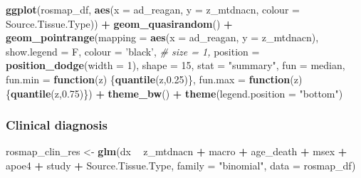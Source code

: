 \documentclass[]{book}
\newenvironment{Shaded}{\begin{snugshade}}{\end{snugshade}}
\newcommand{\CommentTok}[1]{\textcolor[rgb]{0.56,0.35,0.01}{\textit{#1}}}
\newcommand{\ControlFlowTok}[1]{\textcolor[rgb]{0.13,0.29,0.53}{\textbf{#1}}}
\newcommand{\DataTypeTok}[1]{\textcolor[rgb]{0.13,0.29,0.53}{#1}}
\newcommand{\DecValTok}[1]{\textcolor[rgb]{0.00,0.00,0.81}{#1}}
\newcommand{\FloatTok}[1]{\textcolor[rgb]{0.00,0.00,0.81}{#1}}
\newcommand{\KeywordTok}[1]{\textcolor[rgb]{0.13,0.29,0.53}{\textbf{#1}}}
\newcommand{\NormalTok}[1]{#1}
\newcommand{\OperatorTok}[1]{\textcolor[rgb]{0.81,0.36,0.00}{\textbf{#1}}}
\newcommand{\StringTok}[1]{\textcolor[rgb]{0.31,0.60,0.02}{#1}}
\begin{document}
\begin{Shaded}
\begin{Highlighting}[]
\KeywordTok{ggplot}\NormalTok{(rosmap_df, }\KeywordTok{aes}\NormalTok{(}\DataTypeTok{x =}\NormalTok{ ad_reagan, }\DataTypeTok{y =}\NormalTok{ z_mtdnacn, }\DataTypeTok{colour =}\NormalTok{ Source.Tissue.Type)) }\OperatorTok{+}\StringTok{ }
\StringTok{  }\KeywordTok{geom_quasirandom}\NormalTok{() }\OperatorTok{+}\StringTok{ }
\StringTok{  }\KeywordTok{geom_pointrange}\NormalTok{(}\DataTypeTok{mapping =} \KeywordTok{aes}\NormalTok{(}\DataTypeTok{x =}\NormalTok{ ad_reagan, }\DataTypeTok{y =}\NormalTok{ z_mtdnacn),}
                      \DataTypeTok{show.legend =}\NormalTok{ F, }\DataTypeTok{colour =} \StringTok{'black'}\NormalTok{,}
                     \CommentTok{# size = 1,}
                      \DataTypeTok{position =} \KeywordTok{position_dodge}\NormalTok{(}\DataTypeTok{width =} \DecValTok{1}\NormalTok{),}
                      \DataTypeTok{shape =} \DecValTok{15}\NormalTok{,}
                      \DataTypeTok{stat =} \StringTok{"summary"}\NormalTok{,}
                      \DataTypeTok{fun =}\NormalTok{ median,}
                      \DataTypeTok{fun.min =} \ControlFlowTok{function}\NormalTok{(z) \{}\KeywordTok{quantile}\NormalTok{(z,}\FloatTok{0.25}\NormalTok{)\},}
                      \DataTypeTok{fun.max =} \ControlFlowTok{function}\NormalTok{(z) \{}\KeywordTok{quantile}\NormalTok{(z,}\FloatTok{0.75}\NormalTok{)\}) }\OperatorTok{+}\StringTok{ }
\StringTok{  }\KeywordTok{theme_bw}\NormalTok{() }\OperatorTok{+}\StringTok{ }\KeywordTok{theme}\NormalTok{(}\DataTypeTok{legend.position =} \StringTok{"bottom"}\NormalTok{)}
\end{Highlighting}
\end{Shaded}

\hypertarget{clinical-diagnosis}{%
\subsubsection{Clinical diagnosis}\label{clinical-diagnosis}}

\begin{Shaded}
\begin{Highlighting}[]
\NormalTok{rosmap_clin_res <-}\StringTok{ }\KeywordTok{glm}\NormalTok{(dx }\OperatorTok{~}\StringTok{ }\NormalTok{z_mtdnacn }\OperatorTok{+}\StringTok{ }\NormalTok{macro }\OperatorTok{+}\StringTok{ }\NormalTok{age_death }\OperatorTok{+}\StringTok{ }\NormalTok{msex }\OperatorTok{+}\StringTok{ }\NormalTok{apoe4 }\OperatorTok{+}\StringTok{ }\NormalTok{study }\OperatorTok{+}\StringTok{ }\NormalTok{Source.Tissue.Type, }\DataTypeTok{family =} \StringTok{"binomial"}\NormalTok{, }\DataTypeTok{data =}\NormalTok{ rosmap_df)}
\end{Highlighting}
\end{Shaded}
\end{document}

